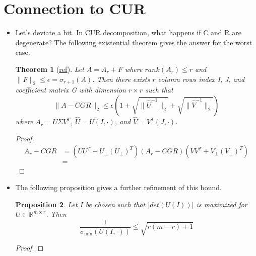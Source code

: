 \documentclass[11pt,reqno]{amsart}
\newtheorem{theorem}{Theorem}
\newtheorem{proposition}[theorem]{Proposition}
\theoremstyle{remark}
\begin{document}
\begin{sloppypar}
\section{Connection to CUR}
\begin{itemize}
\item Let's deviate a bit. In CUR decomposition, what happens if C and R are degenerate? The following existential theorem gives the answer for the worst case.
\begin{theorem}[\href{https://www.sciencedirect.com/science/article/pii/S0024379596003011}{ref}]
Let $A=A_r+F$ where $rank(A_r)\leq r$ and
$\lVert F\rVert_2\leq \epsilon=\sigma_{r+1}(A)$.
Then there exists $r$ column rows index I, J, and coefficient matrix G with dimension $r\times r$ such that
\[
\lVert A-CGR\rVert_2\leq \epsilon(1+\sqrt{\lVert \hat U^{-1}\rVert_2}+
\sqrt{\lVert \hat V^{-1}\rVert_2})
\]
where $A_r=U\Sigma V^T$, $\hat U=U(I, \cdot)$, and $\hat V=V^T(J,\cdot)$.
\end{theorem}
\begin{proof}
\begin{align*}
  A_r-CGR&=(U U^T + U_{\perp} (U_{\perp})^T)(A_r-CGR)(V V^T + V_{\perp} (V_{\perp})^T)\\
  &= 
\end{align*}
\end{proof}
\item The following proposition gives a further refinement of this bound.
\begin{proposition}
Let $I$ be chosen such that $|det(U(I))|$ is maximized for $U\in\mathbb{R}^{m\times r}$. Then
\[
\frac 1{\sigma_{\min}(U(I,\cdot))}\leq\sqrt{r(m-r)+1}
\]
\end{proposition}
\begin{proof}


\end{proof}
\end{itemize}
\end{sloppypar}
\end{document}
